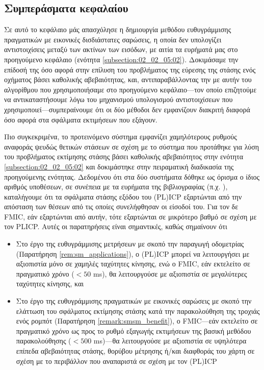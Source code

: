 \subsection{Συμπεράσματα κεφαλαίου}
\label{subsection:02_03_05:01}

Σε αυτό το κεφάλαιο μάς απασχόλησε η δημιουργία μεθόδου ευθυγράμμισης
πραγματικών με εικονικές δισδιάστατες σαρώσεις, η οποία δεν υπολογίζει
αντιστοιχίσεις μεταξύ των ακτίνων των εισόδων, με αιτία τα ευρήματά μας στο
προηγούμενο κεφάλαιο (ενότητα \ref{subsection:02_02_05:02}). Δοκιμάσαμε την
επίδοσή της όσο αφορά στην επίλυση του προβλήματος της εύρεσης της στάσης ενός
οχήματος βάσει καθολικής αβεβαιότητας, και, αντιπαραβάλλοντας την με αυτήν του
αλγορίθμου που χρησιμοποιήσαμε στο προηγούμενο κεφάλαιο---τον οποίο επιζητούμε
να αντικαταστήσουμε λόγω του μηχανισμού υπολογισμού αντιστοιχίσεων που
χρησιμοποιεί---συμπεραίνουμε ότι οι δύο μέθοδοι δεν εμφανίζουν διακριτή διαφορά
όσο αφορά στα σφάλματα εκτιμήσεων που εξάγουν.

Πιο συγκεκριμένα, το προτεινόμενο σύστημα εμφανίζει χαμηλότερους ρυθμούς
αναφοράς ψευδώς θετικών στάσεων σε σχέση με το σύστημα που προτάθηκε για λύση
του προβλήματος εκτίμησης στάσης βάσει καθολικής αβεβαιότητος στην ενότητα
\ref{subsection:02_02_05:02} και δοκιμάστηκε στην πειραματική διαδικασία της
προηγούμενης ενότητας. Δεδομένου ότι στα δύο συστήματα δόθηκε ως όρισμα ο ίδιος
αριθμός υποθέσεων, σε συνέπεια με τα ευρήματα της βιβλιογραφίας (π.χ.
\cite{Olson2009a,bernreiter2021phaser}), καταλήγουμε ότι τα σφάλματα στάσης
εξόδου του (PL)ICP εξαρτώνται από την απόσταση των θέσεων από τις οποίες
συνελήφθησαν οι είσοδοί του. Για τον δε FMIC, εάν εξαρτώνται από αυτήν, τότε
εξαρτώνται σε μικρότερο βαθμό σε σχέση με τον PLICP. Αυτές οι παρατηρήσεις είναι
σημαντικές, καθώς σημαίνουν ότι

\begin{itemize}
  \item Στο έργο της ευθυγράμμισης μετρήσεων με σκοπό την παραγωγή οδομετρίας
        (Παρατήρηση \ref{rem:sm_applications}), ο (PL)ICP μπορεί να λειτουργήσει
        με αξιοπιστία μόνο σε χαμηλές ταχύτητες κίνησης, ενώ ο FMIC, εάν
        εκτελείτο σε πραγματικό χρόνο ($< 50$ ms), θα λειτουργούσε με αξιοπιστία
        σε μεγαλύτερες ταχύτητες κίνησης, και
  \item Στο έργο της ευθυγράμμισης πραγματικών με εικονικές σαρώσεις με σκοπό
        την ελάττωση του σφάλματος εκτίμησης στάσης κατά την παρακολούθηση
        της τροχιάς ενός ρομπότ (Παρατήρηση \ref{remark:smsm_benefit}), ο
        FMIC---εάν εκτελείτο σε πραγματικό χρόνο ως προς το ρυθμό εξαγωγής
        εκτιμήσεων της βασική μεθόδου παρακολούθησης ($< 500$ ms)---θα
        λειτουργούσε με αξιοπιστία σε υψηλότερα επίπεδα αβεβαιότητας στάσης,
        θορύβου μέτρησης ή/και διαφθοράς του χάρτη σε σχέση με το περιβάλλον
        που αναπαριστά σε σχέση με τον (PL)ICP
\end{itemize}

